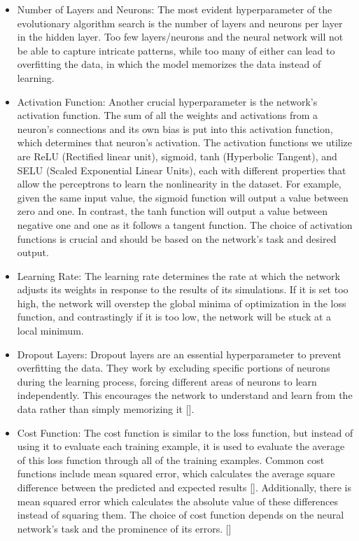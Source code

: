 \begin{itemize}

    \item Number of Layers and Neurons: The most evident hyperparameter of the evolutionary algorithm search is the number of layers and neurons per layer in the hidden layer. Too few layers/neurons and the neural network will not be able to capture intricate patterns, while too many of either can lead to overfitting the data, in which the model memorizes the data instead of learning.
    \item Activation Function: Another crucial hyperparameter is the network's activation function. The sum of all the weights and activations from a neuron's connections and its own bias is put into this activation function, which determines that neuron's activation. The activation functions we utilize are ReLU (Rectified linear unit), sigmoid, tanh (Hyperbolic Tangent), and SELU (Scaled Exponential Linear Units), each with different properties that allow the perceptrons to learn the nonlinearity in the dataset. For example, given the same input value, the sigmoid function will output a value between zero and one. In contrast, the tanh function will output a value between negative one and one as it follows a tangent function. The choice of activation functions is crucial and should be based on the network's task and desired output. 


    \item Learning Rate: The learning rate determines the rate at which the network adjusts its weights in response to the results of its simulations. If it is set too high, the network will overstep the global minima of optimization in the loss function, and contrastingly if it is too low, the network will be stuck at a local minimum.

    \item Dropout Layers: Dropout layers are an essential hyperparameter to prevent overfitting the data. They work by excluding specific portions of neurons during the learning process, forcing different areas of neurons to learn independently. This encourages the network to understand and learn from the data rather than simply memorizing it [\cite{example6}].


    \item Cost Function: The cost function is similar to the loss function, but instead of using it to evaluate each training example, it is used to evaluate the average of this loss function through all of the training examples. Common cost functions include mean squared error, which calculates the average square difference between the predicted and expected results [\cite{example1}]. Additionally, there is mean squared error which calculates the absolute value of these differences instead of squaring them. The choice of cost function depends on the neural network's task and the prominence of its errors. 
    [\cite{example9}]


\end{itemize}

